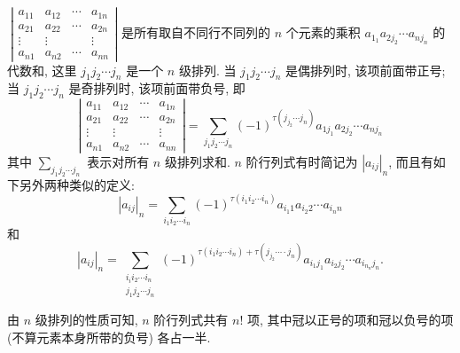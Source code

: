 \begin{definition}
    $~ \left|\begin{array}{cccc}a_{11} & a_{12} & \cdots & a_{1 n} \\ a_{21} & a_{22} & \cdots & a_{2 n} \\ \vdots & \vdots & & \vdots \\ a_{n 1} & a_{n 2} & \cdots & a_{n n}\end{array}\right| $
    是所有取自不同行不同列的 $ n $ 个元素的乘积 $ a_{1_{1}} a_{2 j_{2}} \cdots a_{n j_{n}} $ 的代数和, 这里 $ j_{1} j_{2} \cdots j_{n} $ 是一个 $ n $ 级排列.
    当 $ j_{1} j_{2} \cdots j_{n} $ 是偶排列时, 该项前面带正号; 当 $ j_{1} j_{2} \cdots j_{n} $ 是奇排列时, 该项前面带负号, 即
    $$\left|\begin{array}{cccc}
            a_{11}  & a_{12}  & \cdots & a_{1 n} \\
            a_{21}  & a_{22}  & \cdots & a_{2 n} \\
            \vdots  & \vdots  &        & \vdots  \\
            a_{n 1} & a_{n 2} & \cdots & a_{n n}
        \end{array}\right|=\sum_{j_{1} j_{2} \cdots j_{n}}(-1)^{\tau\left(j_{j_{2}} \cdots j_{n}\right)} a_{1 j_{1}} a_{2 j_{2}} \cdots a_{n j_{n}}$$
    其中 $ \displaystyle\sum_{j_{1} j_{2} \cdots j_{n}} $ 表示对所有 $ n $ 级排列求和. $ n $ 阶行列式有时简记为 $ \left|a_{i j}\right|_{n} $, 而且有如下另外两种类似的定义:
    $$\left|a_{i j}\right|_{n}=\sum_{i_{1} i_{2} \cdots i_{n}}(-1)^{\tau\left(i_{1} i_{2} \cdots i_{n}\right)} a_{i_{1} 1} a_{i_{2} 2} \cdots a_{i_{n} n}$$
    和 $$\left|a_{i j}\right|_{n}=\sum_{\substack{i_{i} i_{2} \cdots i_{n} \\  j_{1} j_{2} \cdots j_{n}}}(-1)^{\tau\left(i_{1} i_{2} \cdots i_{n}\right)+\tau\left(j_{j_{2}} \cdots \cdot j_{n}\right)} a_{i_{1} j_{1}} a_{i_{2} j_{2}} \cdots a_{i_{n_{n}} j_{n}} .$$
\end{definition}

由 $ n $ 级排列的性质可知, $n $ 阶行列式共有 $ n! $ 项, 其中冠以正号的项和冠以负号的项 (不算元素本身所带的负号) 各占一半.

